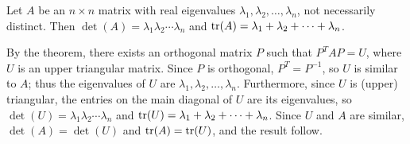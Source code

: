 \documentclass[pdf,9pt]{beamer}
\begin{document}
\begin{frame}[fragile]
\begin{corollary}
  Let $A$ be an $n\times n$ matrix with real eigenvalues
  $\lambda_1, \lambda_2, \ldots, \lambda_n$, not necessarily
  distinct.
  Then $\det(A)=\lambda_1 \lambda_2 \cdots \lambda_n$
  and $\mbox{tr}(A)=\lambda_1 + \lambda_2 + \cdots + \lambda_n$.
\end{corollary}
\pause
\vfill
\begin{proofnoend}
  By the theorem, there exists an orthogonal matrix $P$ such
  that $P^TAP=U$, where $U$ is an upper triangular matrix.
  Since $P$ is orthogonal, $P^T=P^{-1}$, so $U$ is similar to $A$;
  thus the eigenvalues
  of $U$ are $\lambda_1, \lambda_2, \ldots, \lambda_n$.
  Furthermore, since $U$ is (upper) triangular, the entries on the
  main diagonal of $U$ are its eigenvalues, so
  $\det(U)=\lambda_1 \lambda_2 \cdots \lambda_n$ and
  $\mbox{tr}(U)=\lambda_1 + \lambda_2 + \cdots + \lambda_n$.
  Since $U$ and $A$ are similar, $\det(A)=\det(U)$ and $\mbox{tr}(A)=\mbox{tr}(U)$,
  and the result follow.
  \myQED
\end{proofnoend}
\end{frame}
\end{document}
